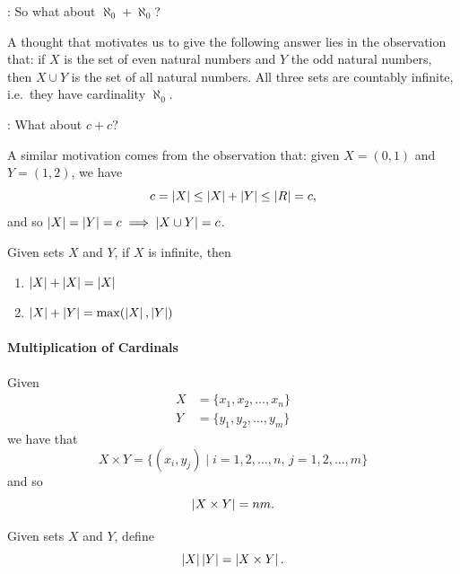 \documentclass[notoc,notitlepage]{tufte-book}
\begin{document}
: So what about $\aleph_0 + \aleph_0$?

A thought that motivates us to give the following answer lies in the observation that: if $X$ is the set of even natural numbers and $Y$ the odd natural numbers, then $X \cup Y$ is the set of all natural numbers. All three sets are countably infinite, i.e.\ they have cardinality $\aleph_0$.

: What about $c + c$?

A similar motivation comes from the observation that: given $X = (0, 1)$ and $Y = (1, 2)$, we have
\begin{equation*}
  c = \left|X\right| \leq \left|X\right| + \left|Y\right| \leq \left|R\right| = c,
\end{equation*}
and so $\left|X\right| = \left|Y\right| = c \implies \left|X \cup Y\right| = c$.

\begin{thm}\label{thm:sums_of_cardinals}
  Given sets $X$ and $Y$, if $X$ is infinite, then
  \begin{enumerate}
    \item $\left|X\right| + \left|X\right| = \left|X\right|$
    \item $\left|X\right| + \left|Y\right| = \max( \left|X\right|, \left|Y\right| )$
  \end{enumerate}
\end{thm}

\paragraph{Multiplication of Cardinals} Given
\begin{align*}
  X &= \{ x_1, x_2, \ldots, x_n \} \\
  Y &= \{ y_1, y_2, \ldots, y_m \}
\end{align*}
we have that
\begin{equation*}
  X \times Y = \{ (x_i, y_j) \mid i = 1, 2, \ldots, n, \, j = 1, 2, \ldots, m \}
\end{equation*}
and so
\begin{equation*}
  \left|X \times Y\right| = nm.
\end{equation*}

\begin{defn}\label{defn:multiplication_of_cardinals}
  Given sets $X$ and $Y$, define
  \begin{equation*}
    \left|X\right| \left|Y\right| = \left|X \times Y\right|.
  \end{equation*}
\end{defn}
\end{document}
